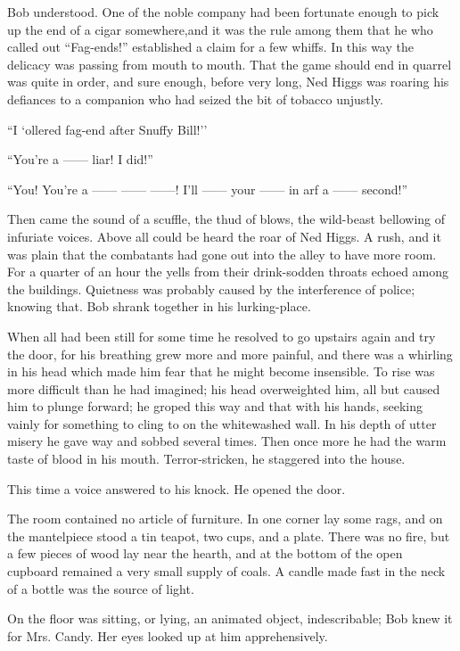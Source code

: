 Bob understood. One of the noble company had been fortunate enough to
pick up the end of a cigar somewhere,and it was the rule among them that
he who called out ``Fag-ends!'' established a claim for a few whiffs. In
this way the delicacy was passing from mouth to mouth. That the game
should end {}in quarrel was quite in order, and sure enough, before very
long, Ned Higgs was roaring his defiances to a companion who had seized
the bit of tobacco unjustly.

``I `ollered fag-end after Snuffy Bill!''

``You're a {{------}} liar! I did!''

``You! You're a {{------}} {{------}} {{------}}! I'll {{------}} your
{{------}} in arf a {{------}} second!''

Then came the sound of a scuffle, the thud of blows, the wild-beast
bellowing of infuriate voices. Above all could be heard the roar of Ned
Higgs. A rush, and it was plain that the combatants had gone out into
the alley to have more room. For a quarter of an hour the yells from
their drink-sodden throats echoed among the buildings. Quietness was
probably caused by the interference of police; knowing that. Bob shrank
together in his lurking-place.

When all had been still for some time he resolved to go upstairs again
and try the door, for his breathing grew more and more painful, and
there was a whirling in his head which made him fear that he might
become insensible. To rise was more difficult than he had imagined; his
head overweighted him, all but caused him to plunge forward; he groped
this {}way and that with his hands, seeking vainly for something to
cling to on the whitewashed wall. In his depth of utter misery he gave
way and sobbed several times. Then once more he had the warm taste of
blood in his mouth. Terror-stricken, he staggered into the house.

This time a voice answered to his knock. He opened the door.

The room contained no article of furniture. In one corner lay some rags,
and on the mantelpiece stood a tin teapot, two cups, and a plate. There
was no fire, but a few pieces of wood lay near the hearth, and at the
bottom of the open cupboard remained a very small supply of coals. A
candle made fast in the neck of a bottle was the source of light.

On the floor was sitting, or lying, an animated object, indescribable;
Bob knew it for Mrs. Candy. Her eyes looked up at him apprehensively.


